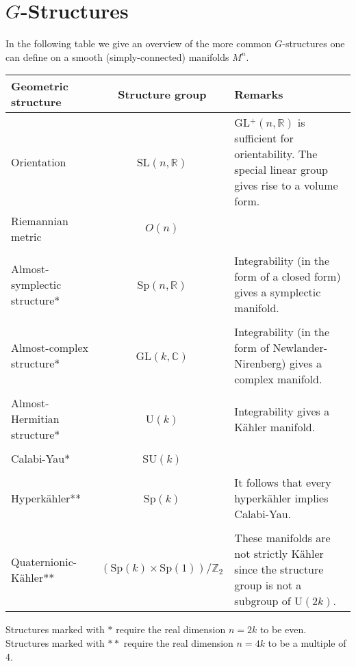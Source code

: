 \chapter{\texorpdfstring{$G$-Structures}{G-Structures}}
    In the following table we give an overview of the more common $G$-structures one can define on a smooth (simply-connected) manifolds $M^n$.
    \begin{center}
        \begin{tabularx}{\textwidth}{|l|c|X|}
             \hline
                 Geometric structure&Structure group&Remarks\\
             \hline
                 Orientation&SL$(n, \mathbb{R})$&GL$^+(n, \mathbb{R})$ is sufficient for orientability. The special linear group gives rise to a volume form.\\
                 Riemannian metric&$O(n)$&\\&&\\
                 Almost-symplectic structure*&Sp$(n, \mathbb{R})$&Integrability (in the form of a closed form) gives a symplectic manifold.\\&&\\
                 Almost-complex structure*&GL$(k, \mathbb{C})$&Integrability (in the form of Newlander-Nirenberg) gives a complex manifold.\\&&\\
                 Almost-Hermitian structure*&U$(k)$&Integrability gives a K\"ahler manifold.\\&&\\
                 Calabi-Yau*&SU$(k)$&\\&&\\
                 Hyperk\"ahler**&Sp$(k)$&It follows that every hyperk\"ahler implies Calabi-Yau.\\&&\\
                 Quaternionic-K\"ahler**\footnotemark&$(\text{Sp}(k)\times\text{Sp}(1))/\mathbb{Z}_2$&These manifolds are not strictly K\"ahler since the structure group is not a subgroup of U$(2k)$.\\
             \hline
        \end{tabularx}
    \end{center}
    Structures marked with $\ast$ require the real dimension $n=2k$ to be even. Structures marked with $\ast\ast$ require the real dimension $n=4k$ to be a multiple of 4.

